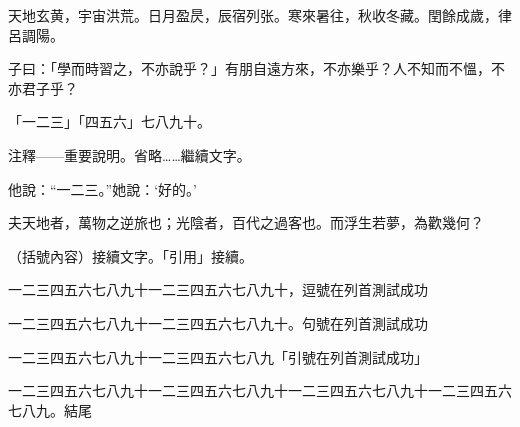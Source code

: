 \documentclass{ltc-book}
\begin{document}
\begin{正文}

天地玄黄，宇宙洪荒。日月盈昃，辰宿列张。寒來暑往，秋收冬藏。閏餘成歲，律呂調陽。

子曰：「學而時習之，不亦說乎？」有朋自遠方來，不亦樂乎？人不知而不慍，不亦君子乎？

「一二三」「四五六」七八九十。

注釋——重要說明。省略……繼續文字。

他說：“一二三。”她說：‘好的。’

夫天地者，萬物之逆旅也；光陰者，百代之過客也。而浮生若夢，為歡幾何？

（括號內容）接續文字。「引用」接續。

\newpage


一二三四五六七八九十一二三四五六七八九十，逗號在列首測試成功

一二三四五六七八九十一二三四五六七八九十。句號在列首測試成功

一二三四五六七八九十一二三四五六七八九「引號在列首測試成功」

一二三四五六七八九十一二三四五六七八九十一二三四五六七八九十一二三四五六七八九。結尾


\end{正文}
\end{document}
